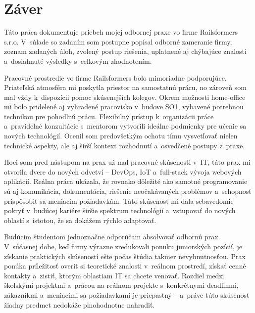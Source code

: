 \chapter*{Záver}
\label{sec:Zaver}

Táto práca dokumentuje priebeh mojej odbornej praxe vo firme Railsformers s.r.o. V~súlade so zadaním som postupne popísal odborné zameranie firmy, zoznam zadaných úloh, zvolený postup riešenia, uplatnené aj chýbajúce znalosti a~dosiahnuté výsledky s~celkovým zhodnotením.

Pracovné prostredie vo firme Railsformers bolo mimoriadne podporujúce. Priateľská atmosféra mi poskytla priestor na samostatnú prácu, no zároveň som mal vždy k~dispozícii pomoc skúsenejších kolegov. Okrem možnosti home-office mi bolo pridelené aj vyhradené pracovisko v~budove SO1, vybavené potrebnou technikou pre pohodlnú prácu. Flexibilný prístup k~organizácii práce a~pravidelné konzultácie s~mentorom vytvorili ideálne podmienky pre učenie sa nových technológií. Ocenil som predovšetkým ochotu tímu vysvetľovať nielen technické aspekty, ale aj širší kontext rozhodnutí a~osvedčené postupy z~praxe.

Hoci som pred nástupom na prax už mal pracovné skúsenosti v~IT, táto prax mi otvorila dvere do nových odvetví -- DevOps, IoT a~full-stack vývoja webových aplikácií. Reálna práca ukázala, že rovnako dôležité ako samotné programovanie sú aj komunikácia, dokumentácia, riešenie neočakávaných problémov a~schopnosť prispôsobiť sa meniacim požiadavkám. Táto skúsenosť mi dala sebavedomie pokryť v~budúcej kariére širšie spektrum technológií a~vstupovať do nových oblastí s~istotou, že sa dokážem rýchlo adaptovať.

Budúcim študentom jednoznačne odporúčam absolvovať odbornú prax. V~súčasnej dobe, keď firmy výrazne zredukovali ponuku juniorských pozícií, je získanie praktických skúseností ešte počas štúdia takmer nevyhnutnosťou. Prax ponúka príležitosť overiť si teoretické znalosti v~reálnom prostredí, získať cenné kontakty a~zistiť, ktorým oblastiam IT sa chcete venovať. Rozdiel medzi školskými projektmi a~prácou na reálnom projekte s~konkrétnymi deadlinmi, zákazníkmi a~meniacimi sa požiadavkami je priepastný -- a~práve túto skúsenosť žiadny predmet nedokáže plnohodnotne nahradiť.

\endinput
